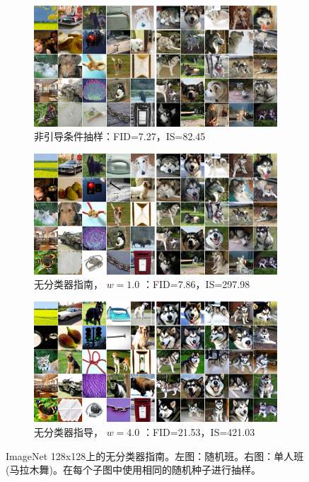 \documentclass{article}
\begin{document}
 \begin{figure}[H]\vspace{-1em}
     \centering
     \begin{subfigure}[b]{\textwidth}
         \centering
         \includegraphics[width=\linewidth]{images/i128_samples_0.jpg}
         \caption{
非引导条件抽样：FID=7.27，IS=82.45}
     \end{subfigure}
     \begin{subfigure}[b]{\textwidth}
         \centering
         \includegraphics[width=\linewidth]{images/i128_samples_10.jpg}
         \caption{
无分类器指南， $w=1.0$ ：FID=7.86，IS=297.98}
     \end{subfigure}
     \begin{subfigure}[b]{\textwidth}
         \centering
         \includegraphics[width=\linewidth]{images/i128_samples_40.jpg}
         \caption{
无分类器指导， $w=4.0$ ：FID=21.53，IS=421.03}
     \end{subfigure}
        \caption{
ImageNet 128x128上的无分类器指南。左图：随机班。右图：单人班(马拉木舞)。在每个子图中使用相同的随机种子进行抽样。}
        \label{fig:i128_samples}
\end{figure} 
\end{document}
